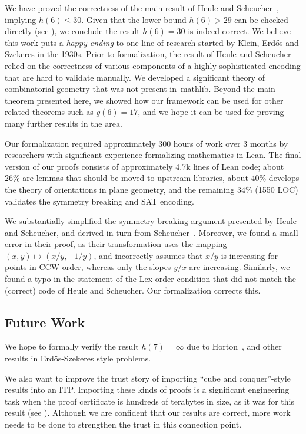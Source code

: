 We have proved the correctness of the main result of Heule and Scheucher~\cite{emptyHexagonNumber},
implying $h(6) \leq 30$.
Given that the lower bound $h(6) > 29$ can be checked directly (see \cite{emptyHexagonNumber}),
we conclude the result $h(6) = 30$ is indeed correct.
We believe this work puts a \emph{happy ending} to
one line of research started by Klein, Erd\H{o}s and Szekeres in the 1930s.
Prior to formalization, the result of Heule and Scheucher
relied on the correctness of various components of a highly sophisticated encoding
that are hard to validate manually.
We developed a significant theory of combinatorial geometry
that was not present in~\textsf{mathlib}.
Beyond the main theorem presented here,
we showed how our framework can be used for other related theorems
such as $g(6) = 17$,
and we hope it can be used for proving many further results in the area.

Our formalization required approximately 300 hours of work over 3 months
by researchers with significant experience formalizing mathematics in Lean.
The final version of our proofs consists of approximately 4.7k lines of Lean code;
about $26\%$ are lemmas that should be moved to upstream libraries,
about $40\%$ develops the theory of orientations in plane geometry,
and the remaining $34\%$ (1550 LOC) validates the symmetry breaking and SAT encoding.

We substantially simplified the symmetry-breaking argument presented by Heule and Scheucher,
and derived in turn from Scheucher~\cite{scheucherTwoDisjoint5holes2020}.
Moreover, we found a small error in their proof,
as their transformation uses the mapping $(x, y) \mapsto (x/y, -1/y)$,
and incorrectly assumes that $x/y$ is increasing for points in CCW-order,
whereas only the slopes $y/x$ are increasing.
Similarly, we found a typo in the statement of the \textsf{Lex order} condition
that did not match the (correct) code of Heule and Scheucher.
Our formalization corrects this.

\subsection*{Future Work}
We hope to formally verify the result $h(7) = \infty$ due to Horton~\cite{hortonSetsNoEmpty1983},
and other results in Erd\H{o}s-Szekeres style problems.

We also want to improve the trust story of importing ``cube and conquer''-style results into an ITP.
Importing these kinds of proofs is a significant engineering task
when the proof certificate is hundreds of terabytes in size,
as it was for this result (see ).
Although we are confident that our results are correct,
more work needs to be done to strengthen the trust in this connection point.
